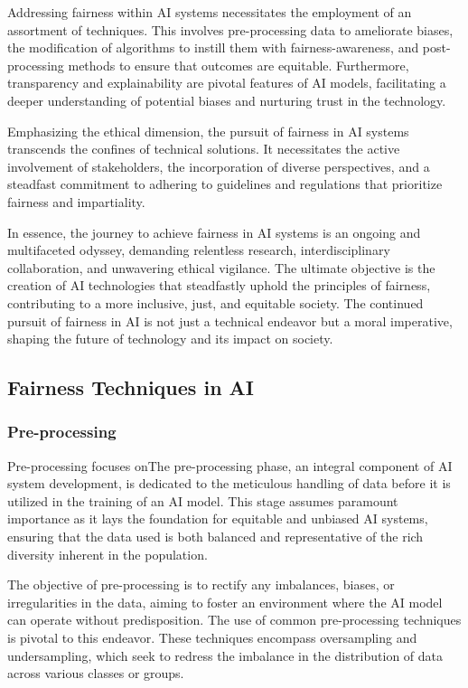 \documentclass[12pt,a4paper,openright,twoside]{book}
\begin{document}
Addressing fairness within AI systems necessitates the employment of an assortment of techniques. This involves pre-processing data to ameliorate biases, the modification of algorithms to instill them with fairness-awareness, and post-processing methods to ensure that outcomes are equitable. Furthermore, transparency and explainability are pivotal features of AI models, facilitating a deeper understanding of potential biases and nurturing trust in the technology. 

Emphasizing the ethical dimension, the pursuit of fairness in AI systems transcends the confines of technical solutions. It necessitates the active involvement of stakeholders, the incorporation of diverse perspectives, and a steadfast commitment to adhering to guidelines and regulations that prioritize fairness and impartiality. 

In essence, the journey to achieve fairness in AI systems is an ongoing and multifaceted odyssey, demanding relentless research, interdisciplinary collaboration, and unwavering ethical vigilance. The ultimate objective is the creation of AI technologies that steadfastly uphold the principles of fairness, contributing to a more inclusive, just, and equitable society. The continued pursuit of fairness in AI is not just a technical endeavor but a moral imperative, shaping the future of technology and its impact on society.

\subsection{Fairness Techniques in AI}

\subsubsection{Pre-processing}

Pre-processing focuses onThe pre-processing phase, an integral component of AI system development, is dedicated to the meticulous handling of data before it is utilized in the training of an AI model. This stage assumes paramount importance as it lays the foundation for equitable and unbiased AI systems, ensuring that the data used is both balanced and representative of the rich diversity inherent in the population. 

The objective of pre-processing is to rectify any imbalances, biases, or irregularities in the data, aiming to foster an environment where the AI model can operate without predisposition. The use of common pre-processing techniques is pivotal to this endeavor. These techniques encompass oversampling and undersampling, which seek to redress the imbalance in the distribution of data across various classes or groups. 
\end{document}
